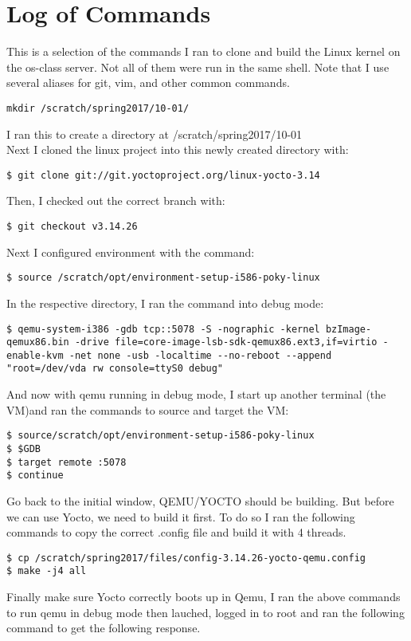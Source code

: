 \documentclass[10pt,conference,draftclsnofoot,onecolumn]{IEEEtran}
\begin{document}
\section{Log of Commands}
This is a selection of the commands I ran to clone and build the Linux kernel on the os-class server. Not all of them were run in the same shell.
Note that I use several aliases for git, vim, and other common commands.
\begin{lstlisting}
mkdir /scratch/spring2017/10-01/
\end{lstlisting}
I ran this to create a directory at /scratch/spring2017/10-01\\
Next I cloned the linux project into this newly created directory with:
\begin{lstlisting}
$ git clone git://git.yoctoproject.org/linux-yocto-3.14 
\end{lstlisting}
Then, I checked out the correct branch with:
\begin{lstlisting}
$ git checkout v3.14.26
\end{lstlisting}
Next I configured environment with the command:
\begin{lstlisting}
$ source /scratch/opt/environment-setup-i586-poky-linux
\end{lstlisting}
In the respective directory, I ran the command into debug mode:
\begin{lstlisting}
$ qemu-system-i386 -gdb tcp::5078 -S -nographic -kernel bzImage-qemux86.bin -drive file=core-image-lsb-sdk-qemux86.ext3,if=virtio -enable-kvm -net none -usb -localtime --no-reboot --append "root=/dev/vda rw console=ttyS0 debug"
\end{lstlisting}
And now with qemu running in debug mode, I start up another terminal (the VM)and ran the commands to source and target the VM:
\begin{lstlisting}
$ source/scratch/opt/environment-setup-i586-poky-linux
$ $GDB
$ target remote :5078
$ continue
\end{lstlisting}
Go back to the initial window, QEMU/YOCTO should be building. But before we can use Yocto, we need to build it first.  To do so I ran the following commands to copy the correct .config file and build it with 4 threads.

\begin{lstlisting}
$ cp /scratch/spring2017/files/config-3.14.26-yocto-qemu.config
$ make -j4 all
\end{lstlisting}
Finally make sure Yocto correctly boots up in Qemu, I ran the above commands to run qemu in debug mode then lauched, logged in to root and ran the following command to get the following response.
\end{document}

